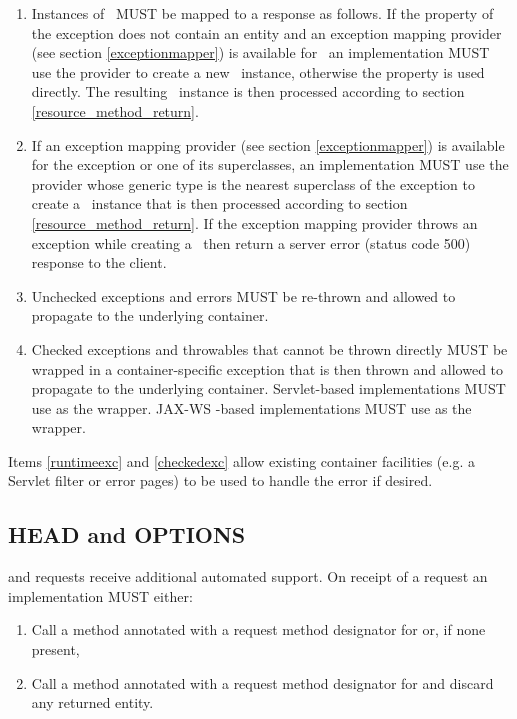 \begin{enumerate}
\item Instances of \WebAppExc\ MUST be mapped to a response as follows. If the  property of the exception does not contain an entity and an exception mapping provider (see section \ref{exceptionmapper}) is available for \WebAppExc\, an implementation MUST use the provider to create a new \Response\ instance, otherwise the  property is used directly. The resulting \Response\ instance is then processed according to section \ref{resource_method_return}.
\item If an exception mapping provider (see section \ref{exceptionmapper}) is available for the exception or one of its superclasses, an implementation MUST use the provider whose generic type is the nearest superclass of the exception to create a \Response\ instance that is then processed according to section \ref{resource_method_return}. If the exception mapping provider throws an exception while creating a \Response\ then return a server error (status code 500) response to the client.
\item\label{runtimeexc} Unchecked exceptions and errors MUST be re-thrown and allowed to propagate to the underlying container.
\item\label{checkedexc} Checked exceptions and throwables that cannot be thrown directly MUST be wrapped in a container-specific exception that is then thrown and allowed to propagate to the underlying container. Servlet-based implementations MUST use  as the wrapper. JAX-WS -based implementations MUST use  as the wrapper.
\end{enumerate}

\begin{nnnote}Items \ref{runtimeexc} and \ref{checkedexc} allow existing container facilities (e.g. a Servlet filter or error pages) to be used to handle the error if desired.\end{nnnote}

\subsection{HEAD and OPTIONS}
\label{head_and_options}

 and  requests receive additional automated support. On receipt of a  request an implementation MUST either:

\begin{enumerate}
\item Call a method annotated with a request method designator for  or, if none present,
\item\label{get_not_head} Call a method annotated with a request method designator for  and discard any returned entity.
\end{enumerate}

